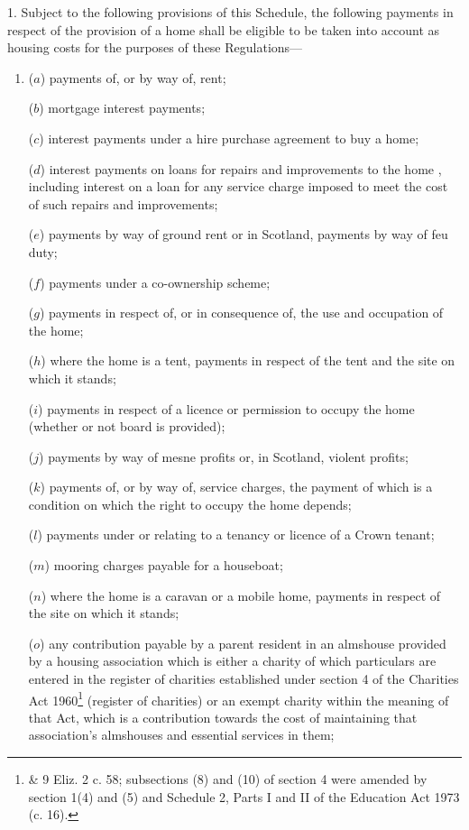 \documentclass[12pt,a4paper]{article}
\begin{document}
1.  Subject to the following provisions of this Schedule, the following payments in respect of the provision of a home shall be eligible to be taken into account as housing costs for the purposes of these Regulations—
\begin{enumerate}\item[]
($a$) payments of, or by way of, rent;

($b$) mortgage interest payments;

($c$) interest payments under a hire purchase agreement to buy a home;

($d$) interest payments on loans for repairs and improvements to the home%
, including interest on a loan for any service charge imposed to meet the cost of such repairs and improvements; %

($e$) payments by way of ground rent or in Scotland, payments by way of feu duty;

($f$) payments under a co-ownership scheme;

($g$) payments in respect of, or in consequence of, the use and occupation of the home;

($h$) where the home is a tent, payments in respect of the tent and the site on which it stands;

($i$) payments in respect of a licence or permission to occupy the home (whether or not board is provided);

($j$) payments by way of mesne profits or, in Scotland, violent profits;

($k$) payments of, or by way of, service charges, the payment of which is a condition on which the right to occupy the home depends;

($l$) payments under or relating to a tenancy or licence of a Crown tenant;

($m$) mooring charges payable for a houseboat;

($n$) where the home is a caravan or a mobile home, payments in respect of the site on which it stands;

($o$) any contribution payable by a parent resident in an almshouse provided by a housing association which is either a charity of which particulars are entered in the register of charities established under section 4 of the Charities Act 1960\footnote{ \& 9 Eliz. 2 c. 58; subsections (8) and (10) of section 4 were amended by section 1(4) and (5) and Schedule 2, Parts I and II of the Education Act 1973 (c. 16).} (register of charities) or an exempt charity within the meaning of that Act, which is a contribution towards the cost of maintaining that association’s almshouses and essential services in them;


\end{enumerate}
\end{document}
